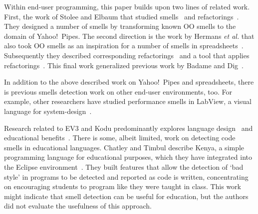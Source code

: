 \documentclass[conference]{IEEEtran}
\begin{document}
Within end-user programming, this paper builds upon two lines of related work. First, the work of Stolee and Elbaum that studied smells~\cite{StoleeTSE2013} and refactorings~\cite{Stolee2011}. They designed a number of smells by transforming known OO smells to the domain of Yahoo!\ Pipes. The second direction is the work by Hermans \emph{et al.} that also took OO smells as an inspiration for a number of smells in spreadsheets~\cite{Hermans2012intra, Hermans2012inter}. Subsequently they described corresponding refactorings~\cite{Hermans2012intraExt} and a tool that applies refactorings~\cite{hermans2014bumblebee}. This final work generalized previous work by Badame and Dig~\cite{badame2012refactoring}.


In addition to the  above described work on Yahoo!\ Pipes and spreadsheets, there is previous smells detection work on other end-user environments, too. For example, other researchers have studied performance smells in LabView, a visual language for system-design~\cite{chambers2013smell, chambers2015impact}. 

Research related to  EV3 and Kodu predominantly explores 
language design~\cite{Fristoe:2011:SSE:2159365.2159396, Stolee:2011:ECS:1953163.1953197, MacLaurin:2009:KEP:1536513.1536516, MacLaurin:2011:DKT:1925844.1926413} 
and educational benefits~\cite{Fowler:2011:KGL:2159365.2159398, Touretzky:2013:AKC:2445196.2445374, Barnes:2002:TIJ:563340.563397, Hood:2005:TPL:1067445.1067454}. 
There is some, albeit limited, work on detecting code smells in educational languages. Chatley and Timbul describe Kenya, a simple programming language for educational purposes, which they have integrated into the Eclipse environment~\cite{Chatley2005}. They built features that allow the detection of `bad style' in programs to be detected and reported as code is written, concentrating on encouraging students to program like they were taught in class. This work might indicate that smell detection can be useful for education, but the authors  did not evaluate the usefulness of this approach.
\end{document}
